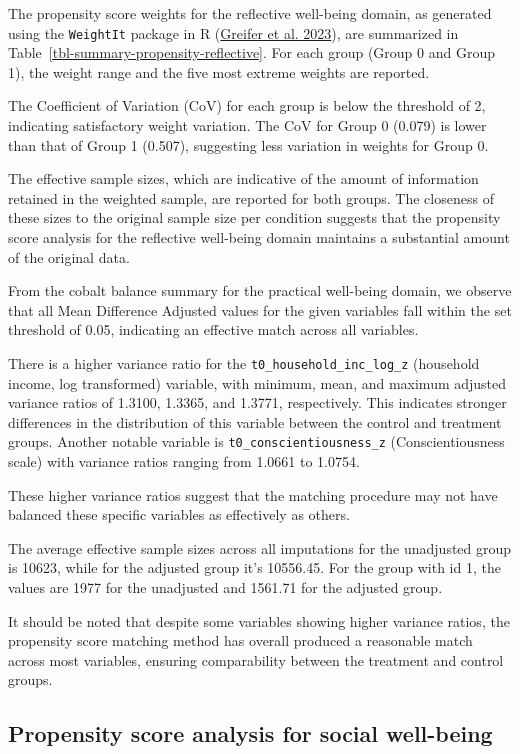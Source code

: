 \documentclass[
  singlecolumn]{report}
\begin{document}
The propensity score weights for the reflective well-being domain, as
generated using the \texttt{WeightIt} package in R
(\protect\hyperlink{ref-greifer2023}{Greifer et al. 2023}), are
summarized in Table~\ref{tbl-summary-propensity-reflective}. For each
group (Group 0 and Group 1), the weight range and the five most extreme
weights are reported.

The Coefficient of Variation (CoV) for each group is below the threshold
of 2, indicating satisfactory weight variation. The CoV for Group 0
(0.079) is lower than that of Group 1 (0.507), suggesting less variation
in weights for Group 0.

The effective sample sizes, which are indicative of the amount of
information retained in the weighted sample, are reported for both
groups. The closeness of these sizes to the original sample size per
condition suggests that the propensity score analysis for the reflective
well-being domain maintains a substantial amount of the original data.

From the cobalt balance summary for the practical well-being domain, we
observe that all Mean Difference Adjusted values for the given variables
fall within the set threshold of 0.05, indicating an effective match
across all variables.

There is a higher variance ratio for the
\texttt{t0\_household\_inc\_log\_z} (household income, log transformed)
variable, with minimum, mean, and maximum adjusted variance ratios of
1.3100, 1.3365, and 1.3771, respectively. This indicates stronger
differences in the distribution of this variable between the control and
treatment groups. Another notable variable is
\texttt{t0\_conscientiousness\_z} (Conscientiousness scale) with
variance ratios ranging from 1.0661 to 1.0754.

These higher variance ratios suggest that the matching procedure may not
have balanced these specific variables as effectively as others.

The average effective sample sizes across all imputations for the
unadjusted group is 10623, while for the adjusted group it's 10556.45.
For the group with id 1, the values are 1977 for the unadjusted and
1561.71 for the adjusted group.

It should be noted that despite some variables showing higher variance
ratios, the propensity score matching method has overall produced a
reasonable match across most variables, ensuring comparability between
the treatment and control groups.

\hypertarget{propensity-score-analysis-for-social-well-being}{%
\subsection{Propensity score analysis for social
well-being}\label{propensity-score-analysis-for-social-well-being}}
\end{document}
